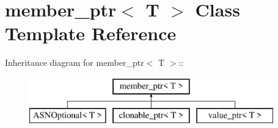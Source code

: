 \hypertarget{classmember__ptr}{
\section{member\_\-ptr$<$ T $>$ Class Template Reference}
\label{classmember__ptr}
}
Inheritance diagram for member\_\-ptr$<$ T $>$::\begin{figure}[H]
\begin{center}
\leavevmode
\includegraphics[height=2cm]{classmember__ptr}
\end{center}
\end{figure}
